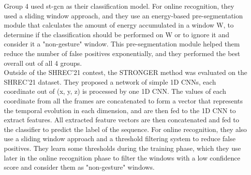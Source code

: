 Group 4 \cite{shrec21} used st-gcn \cite{st-gcn} as their classification model. For online recognition, they used a sliding window approach, and they use an energy-based pre-segmentation module that calculates the amount of energy accumulated in a window W, to determine if the classification should be performed on W or to ignore it and consider it a "non-gesture" window. This pre-segmentation module helped them reduce the number of false positives exponentially, and they performed the best overall out of all 4 groups.\\

Outside of the SHREC'21 contest, the STRONGER method \cite{emporio2021stronger} was evaluated on the SHREC'21 dataset. They proposed a network of simple 1D CNNs, each coordinate out of (x, y, z) is processed by one 1D CNN. The values of each coordinate from all the frames are concatenated to form a vector that represents the temporal evolution in each dimension, and are then fed to the 1D CNN to extract features. All extracted feature vectors are then concatenated and fed to the classifier to predict the label of the sequence. For online recognition, they also use a sliding window approach and a threshold filtering system to reduce false positives. They learn some thresholds during the training phase, which they use later in the online recognition phase to filter the windows with a low confidence score and consider them as "non-gesture" windows.